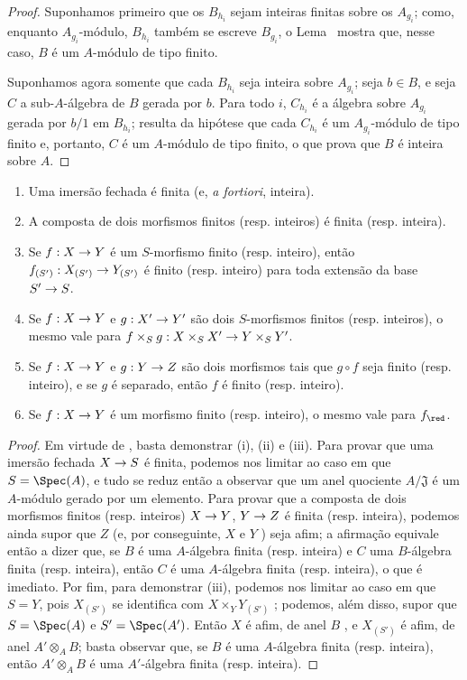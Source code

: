 \documentclass[oneside,10pt]{amsart}
\makeatletter
\newcommand{\ega@arrow}[2]{\mathchoice{#1}{#2}{#2}{#2}}
\renewcommand{\to}{\ega@arrow{\longrightarrow}{\rightarrow}}
\newcommand{\oldpage}[2][]{\marginnote{\normalfont\footnotesize\textbf{#1}~|~#2}\ignorespaces}
\let\EGAOriginalLabel\label
\renewcommand{\label}[1]{\phantomsection\EGAOriginalLabel{#1}}
\makeatother
\begin{document}
\begin{proof}
Suponhamos primeiro que os $B_{h_i}$ sejam inteiras finitas sobre os $A_{g_i}$;
como, enquanto $A_{g_i}$-módulo, $B_{h_i}$ também se escreve $B_{g_i}$, o Lema~ mostra que, nesse caso, $B$ é um $A$-módulo de tipo finito.

Suponhamos agora somente que cada $B_{h_i}$ seja inteira sobre $A_{g_i}$;
seja $b\in B$, e seja $C$ a sub-$A$-álgebra de $B$ gerada por $b$.
Para todo $i$, $C_{h_i}$ é a álgebra sobre $A_{g_i}$ gerada por $b/1$ em $B_{h_i}$;
resulta da hipótese que cada $C_{h_i}$ é um $A_{g_i}$-módulo de tipo finito e, portanto,  $C$ é um $A$-módulo de tipo finito, o que prova que $B$ é inteira sobre $A$.
\end{proof}

\begin{proposition}[6.1.5]
\label{II.6.1.5}
\medskip\noindent
\begin{enumerate}
  \item[\rm{(i)}] Uma imersão fechada é finita (e, \emph{a fortiori}, inteira).
  \item[\rm{(ii)}] A composta de dois morfismos finitos (resp. inteiros) é finita (resp. inteira).
  \item[\rm{(iii)}] Se $f:X\to Y$ é um $S$-morfismo finito (resp. inteiro), então $f_{(S')}:X_{(S')}\to Y_{(S')}$ é finito (resp. inteiro) para toda extensão da base $S'\to S$.
  \item[\rm{(iv)}] Se $f:X\to Y$ e $g:X'\to Y'$ são dois $S$-morfismos finitos (resp. inteiros), o mesmo vale para $f\times_S g:X\times_S X'\to Y\times_S Y'$.
  \item[\rm{(v)}] Se $f:X\to Y$ e $g:Y\to Z$ são dois morfismos tais que $g\circ f$ seja finito (resp. inteiro), e se $g$ é separado, então $f$ é finito (resp. inteiro).
  \item[\rm{(vi)}] Se $f:X\to Y$ é um morfismo finito (resp. inteiro), o mesmo vale para $f_\red$.
\end{enumerate}
\end{proposition}
\oldpage[II]{112}
\begin{proof}
Em virtude de , basta demonstrar (i), (ii) e (iii).
Para provar que uma imersão fechada $X\to S$ é finita, podemos nos limitar ao caso em que $S=\Spec(A)$, e tudo se reduz então a observar que um anel quociente $A/\mathfrak{J}$ é um $A$-módulo gerado por um elemento.
Para provar que a composta de dois morfismos finitos (resp. inteiros) $X\to Y$, $Y\to Z$ é finita (resp. inteira), podemos ainda supor que $Z$ (e, por conseguinte, $X$ e $Y$ ) seja afim; a afirmação equivale então a dizer que, se $B$ é uma $A$-álgebra finita (resp. inteira) e $C$ uma $B$-álgebra finita (resp. inteira), então $C$ é uma $A$-álgebra finita (resp. inteira), o que é imediato.
Por fim, para demonstrar (iii), podemos nos limitar ao caso em que $S=Y$, pois $X_{(S')}$ se identifica com $X\times_Y Y_{(S')}$ ;
podemos, além disso, supor que $S=\Spec(A)$ e $S'=\Spec(A')$.
Então $X$ é afim, de anel $B$ , e $X_{(S')}$ é afim, de anel $A'\otimes_A B$;
basta observar que, se $B$ é uma $A$-álgebra finita (resp. inteira), então $A'\otimes_A B$ é uma $A'$-álgebra finita (resp. inteira).
\end{proof}
\end{document}
